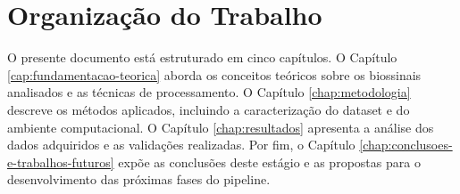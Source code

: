 \section{Organização do Trabalho}

O presente documento está estruturado em cinco capítulos. O Capítulo \ref{cap:fundamentacao-teorica} aborda os conceitos teóricos sobre os biossinais analisados e as técnicas de processamento. O Capítulo \ref{chap:metodologia} descreve os métodos aplicados, incluindo a caracterização do dataset e do ambiente computacional. O Capítulo \ref{chap:resultados} apresenta a análise dos dados adquiridos e as validações realizadas. Por fim, o Capítulo \ref{chap:conclusoes-e-trabalhos-futuros} expõe as conclusões deste estágio e as propostas para o desenvolvimento das próximas fases do pipeline.
